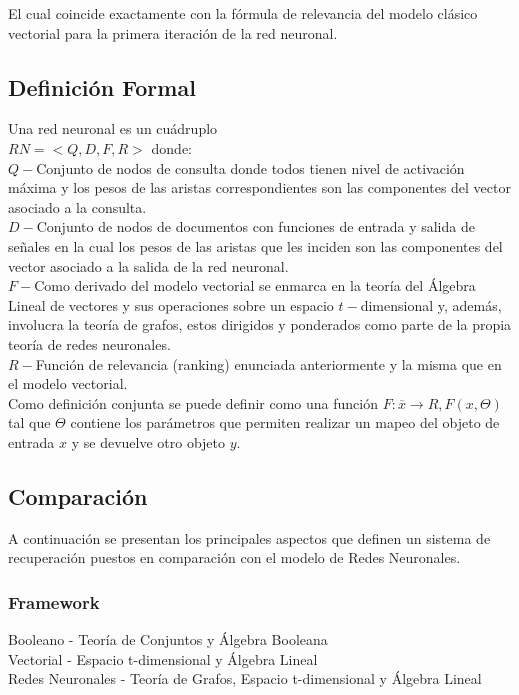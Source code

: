 \documentclass{llncs}
\begin{document}
\begin{multicols}{2}[]
El cual coincide exactamente con la f\'ormula de relevancia del modelo cl\'asico vectorial para la primera iteraci\'on de la red neuronal.\\

\subsection{Definici\'on Formal}

Una red neuronal es un cu\'adruplo \\$RN = <Q, D, F, R>$ donde: \\

$Q - $Conjunto de nodos de consulta donde todos tienen nivel de activaci\'on m\'axima y los pesos de las aristas correspondientes son las componentes del vector
asociado a la consulta.\\

$D - $Conjunto de nodos de documentos con funciones de entrada y salida de se\~nales en la cual los pesos de las aristas que les inciden son las componentes del
vector asociado a la salida de la red neuronal.\\

$F - $Como derivado del modelo vectorial se enmarca en la teor\'ia del \'Algebra Lineal de vectores y sus operaciones sobre un espacio $t-$dimensional y, adem\'as,
involucra la teor\'ia de grafos, estos dirigidos y ponderados como parte de la propia teor\'ia de redes neuronales.\\

$R -$Funci\'on de relevancia (ranking) enuncia\-da anteriormente y la misma que en el modelo vectorial.\\

Como definici\'on conjunta se puede definir como una funci\'on $F:\overline{x} \rightarrow R, F(x, \Theta)$ tal que $\Theta$ contiene los par\'ametros
que permiten realizar un mapeo del objeto de entrada $x$ y se devuelve otro objeto $y$.\\

\subsection{Comparaci\'on}

A continuaci\'on se presentan los principales aspectos que definen un sistema de recuperaci\'on puestos en comparaci\'on con el modelo de Redes Neuronales.\\

\subsubsection{Framework}
Booleano - Teor\'ia de Conjuntos y \'Algebra Booleana \\
Vectorial - Espacio t-dimensional y \'Algebra Lineal \\
Redes Neuronales - Teor\'ia de Grafos, Espacio t-dimensional y \'Algebra Lineal


\end{multicols}
\end{document}

